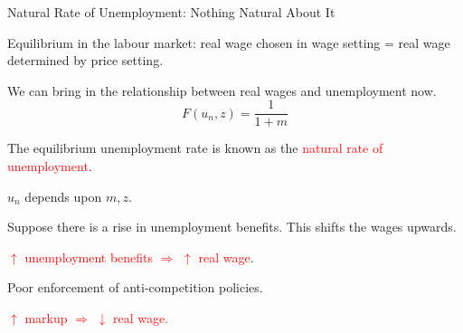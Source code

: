 \documentclass[shownotes,11pt, aspectratio=169]{beamer}
\newenvironment{wideitemize}{\itemize\addtolength{\itemsep}{10pt}}{\enditemize}
\begin{document}
\begin{frame}{Natural Rate of Unemployment: Nothing Natural About It}
\begin{wideitemize}
\item Equilibrium in the labour market: real wage chosen in wage setting = real wage determined by price setting.
\item We can bring in the relationship between real wages and unemployment now. 
     \[ F(u_n, z) = \frac{1}{1 + m} \]
\item The equilibrium unemployment rate is known as the \textcolor{red}{natural rate of unemployment}.
\item $u_n$ depends upon $m, z$.
\end{wideitemize}
\end{frame}

\begin{frame}
\begin{wideitemize}
\item Suppose there is a rise in unemployment benefits. This shifts the wages upwards.
\pause
\item \textcolor{red}{$\uparrow$ unemployment benefits $\Rightarrow$ $\uparrow$ real wage}.
\pause
\item Poor enforcement of anti-competition policies. \pause 
\item \textcolor{red}{$\uparrow$ markup $\Rightarrow$ $\downarrow$ real wage.}
\end{wideitemize}
\end{frame}

\begin{frame}
\end{frame}
\end{document}
